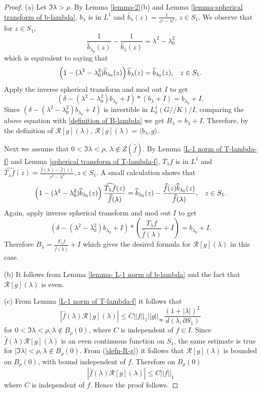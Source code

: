 \documentclass[11pt,reqno]{amsart}
\theoremstyle{definition}
\theoremstyle{definition}
\numberwithin{equation}{section}
\begin{document}
\begin{proof}
(a) Let $\Im\lambda>\rho$. By Lemma \ref{lemma-2}(b) and  Lemma \ref{lemma-spherical transform of b-lambda}, $b_\lambda$ is in $L^1$ and $\widehat{b}_\lambda(z)=\frac{1}{z^2-\lambda^2}$, $z\in S_1$. We observe that for $z\in S_1$,
$$
\frac{1}{\widehat{b}_{\lambda_0}(z)}-\frac{1}{\widehat{b}_\lambda(z)}=\lambda^2-\lambda_0^2
$$
which is equivalent to saying that
$$
\left(1-(\lambda^2-\lambda_0^2)
\widehat{b}_{\lambda_0}(z)\right)\widehat{b}_\lambda(z)=\widehat{b}_{\lambda_0}(z),\hspace{3mm}z\in S_1.
$$
Apply the inverse spherical transform and mod out $I$ to get
$$
\left(\delta-(\lambda^2-\lambda_0^2)
b_{\lambda_0}+I\right)*(b_\lambda+I) =b_{\lambda_0}+I,
$$
Since $\left(\delta-(\lambda^2-\lambda_0^2)
b_{\lambda_0}+I\right)$ is invertible in $L^1_\delta(G//K)/I$, comparing the above equation with \ref{definition of B-lambda} we get $B_\lambda=b_\lambda+I$. Therefore, by the definition of $\mathcal{R}[g](\lambda)$, $\mathcal{R}[g](\lambda)=\langle b_\lambda,g\rangle$.

Next we assume that $0<\Im\lambda<\rho$, $\lambda\notin Z(\widehat{f})$. By Lemma \ref{L-1 norm of T-lambda-f} and Lemma \ref{spherical transform of T-lambda-f}, $T_\lambda f$ is in $L^1$ and $\widehat{T_\lambda f}(z)=\frac{\widehat{f}(\lambda)-\widehat{f}(z)}{z^2-\lambda^2}, z\in S_1$. A small calculation shows that
$$
\left(1-(\lambda^2-\lambda_0^2)
\widehat{b}_{\lambda_0}(z)\right)\frac{\widehat{T_\lambda f}(z)}{\widehat{f}(\lambda)}=\widehat{b}_{\lambda_0}(z)-\frac{\widehat{f}(z)\widehat{b}_{\lambda_0}(z)}{\widehat{f}(\lambda)},\hspace{3mm}z\in S_1.
$$
Again, apply inverse spherical transform and mod out $I$ to get
$$
\left(\delta-(\lambda^2-\lambda_0^2)
b_{\lambda_0}+I\right)*\left(\frac{T_\lambda f}{\widehat{f}(\lambda)}+I\right) =b_{\lambda_0}+I.
$$
Therefore $B_\lambda=\frac{T_\lambda f}{\widehat{f}(\lambda)}+I$ which gives the desired formula for $\mathcal{R}[g](\lambda)$ in this case.
 
(b) It follows from Lemma \ref{lemma- L-1 norm of b-lambda} and the fact that $\mathcal{R}[g](\lambda)$ is even.

(c) From Lemma \ref{L-1 norm of T-lambda-f} it follows that $$\left|\widehat{f}(\lambda)\mathcal{R}[g](\lambda)\right|\leq C||f||_1||g||_\infty\frac{(1+|\lambda|)^L}{d(\lambda,\partial S_1)}$$ for $0<\Im\lambda<\rho,\lambda\not\in B_\rho(0)$, where $C$ is independent of $f\in I$. Since $\widehat{f}(\lambda)\mathcal{R}[g](\lambda)$ is an even continuous function on $ S_1$, the same estimate is true for $|\Im\lambda|<\rho, \lambda\not\in B_\rho(0)$. From (\ref{defn-R-g}) it follows that  $\mathcal{R}[g](\lambda)$ is bounded on $ B_\rho(0)$, with bound independent of $f$. Therefore  on $ B_\rho(0)$$$\left|\widehat{f}(\lambda)\mathcal{R}[g](\lambda)\right|\leq C||f||_1$$ where $C$ is independent of $f$. Hence the proof follows.
\end{proof}
\end{document}
